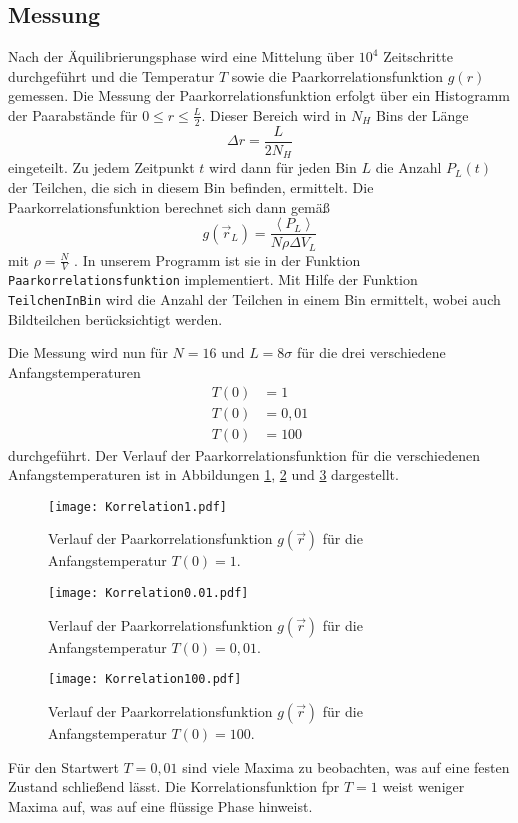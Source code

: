 \subsection*{Messung}
Nach der Äquilibrierungsphase wird eine Mittelung über $10^4$ Zeitschritte durchgeführt und die Temperatur $T$
sowie die Paarkorrelationsfunktion $g(r)$ gemessen.
Die Messung der Paarkorrelationsfunktion erfolgt über ein Histogramm der Paarabstände für $0 \leq r \leq \frac{L}{2}$.
Dieser Bereich wird in $N_H$ Bins der Länge
\begin{equation*}
    \Delta r = \frac{L}{2 N_H}
\end{equation*} 
eingeteilt. Zu jedem Zeitpunkt $t$ wird dann 
für jeden Bin $L$ die Anzahl $P_L(t)$ der Teilchen, die sich in diesem Bin befinden, ermittelt.
Die Paarkorrelationsfunktion berechnet sich dann gemäß
\begin{equation*}
    g \left(\vec{r}_L\right) = \frac{\left\langle P_L \right\rangle}{N \rho \Delta V_L}
\end{equation*}
mit $\rho =  \frac{N}{V}$ .
In unserem Programm ist sie in der Funktion \texttt{Paarkorrelationsfunktion} implementiert. 
Mit Hilfe der Funktion \texttt{TeilchenInBin} wird die Anzahl der Teilchen in einem Bin ermittelt, wobei auch Bildteilchen berücksichtigt werden.

Die Messung wird nun für $N = 16$ und $L = 8 \sigma$ für die drei verschiedene Anfangstemperaturen 
\begin{align*}
    T(0) &= 1 \\
    T(0) &= 0,01 \\
    T(0) &= 100 
\end{align*}
durchgeführt.
Der Verlauf der Paarkorrelationsfunktion für die verschiedenen Anfangstemperaturen ist in Abbildungen \ref{fig:p1}, \ref{fig:p2} und \ref{fig:p3}
dargestellt.
\FloatBarrier
\begin{figure}[H]
    \centering
    \texttt{[image: Korrelation1.pdf]}
    \caption{Verlauf der Paarkorrelationsfunktion $g(\vec{r})$ für die Anfangstemperatur $T(0) = 1$.}
    \label{fig:p1}
\end{figure}
\FloatBarrier
\noindent
\FloatBarrier
\begin{figure}[H]
    \centering
    \texttt{[image: Korrelation0.01.pdf]}
    \caption{Verlauf der Paarkorrelationsfunktion $g(\vec{r})$ für die Anfangstemperatur $T(0) = 0,01$.}
    \label{fig:p2}
\end{figure}
\FloatBarrier
\noindent
\FloatBarrier
\begin{figure}[H]
    \centering
    \texttt{[image: Korrelation100.pdf]}
    \caption{Verlauf der Paarkorrelationsfunktion $g(\vec{r})$ für die Anfangstemperatur $T(0) = 100$.}
    \label{fig:p3}
\end{figure}
\FloatBarrier
\noindent
Für den Startwert $T=0,01$ sind viele Maxima zu beobachten, was auf eine festen Zustand schließend lässt. 
Die Korrelationsfunktion fpr $T=1$ weist weniger Maxima auf, was auf eine flüssige Phase hinweist.

